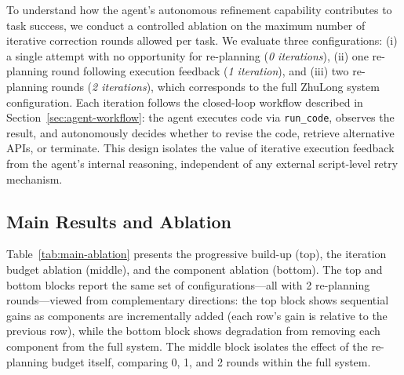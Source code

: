 \documentclass[anonymous, sigconf]{acmart}
\begin{document}
To understand how the agent's autonomous refinement capability contributes 
to task success, we conduct a controlled ablation on the maximum number of 
iterative correction rounds allowed per task.
We evaluate three configurations: (i) a single attempt with no opportunity 
for re-planning (\textit{0 iterations}), (ii) one re-planning round 
following execution feedback (\textit{1 iteration}), and (iii) two 
re-planning rounds (\textit{2 iterations}), which corresponds to the full 
ZhuLong system configuration.
Each iteration follows the closed-loop workflow described in 
Section~\ref{sec:agent-workflow}: the agent executes code via 
\texttt{run\_code}, observes the result, and autonomously decides whether 
to revise the code, retrieve alternative APIs, or terminate.
This design isolates the value of iterative execution feedback from the 
agent's internal reasoning, independent of any external script-level retry 
mechanism.

\subsection{Main Results and Ablation}
\label{sec:exp-results}

Table~\ref{tab:main-ablation} presents the progressive build-up (top), the 
iteration budget ablation (middle), and the component ablation (bottom). 
The top and bottom blocks report the same set of configurations---all with 
2 re-planning rounds---viewed from complementary directions: the top block 
shows sequential gains as components are incrementally added (each row's 
gain is relative to the previous row), while the bottom block shows 
degradation from removing each component from the full system. The middle 
block isolates the effect of the re-planning budget itself, comparing 0, 1, 
and 2 rounds within the full system.
\end{document}

